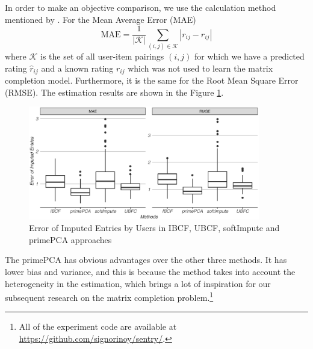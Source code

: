 \documentclass[a4paper,12pt,authoryear]{elegantpaper}
\begin{document}
    In order to make an objective comparison, we use the calculation method mentioned by \citet{hahsler_recommenderlab_2020}. For the Mean Average Error (MAE)
    \begin{equation*}
        \mathrm{MAE}=\frac{1}{|\mathcal{K}|} \sum_{(i, j) \in \mathcal{K}}\left|r_{i j}-\hat{r}_{i j}\right|
    \end{equation*}
    where $\mathcal{K}$ is the set of all user-item pairings $(i, j)$ for which we have a predicted rating $\hat{r}_{i j}$ and a known rating $r_{i j}$ which was not used to learn the matrix completion model. Furthermore, it is the same for the Root Mean Square Error (RMSE). The estimation results are shown in the Figure \ref{figure:ml10m}.

    \begin{figure}[!hbt]
        \centering
        \includegraphics[width=0.9\textwidth]{./figures/ml10m.eps}
        \caption{Error of Imputed Entries by Users in IBCF, UBCF, softImpute and primePCA approaches}
        \label{figure:ml10m}
    \end{figure}

    The primePCA has obvious advantages over the other three methods. It has lower bias and variance, and this is because the method takes into account the heterogeneity in the estimation, which brings a lot of inspiration for our subsequent research on the matrix completion problem.\footnote{All of the experiment code are available at \href{https://github.com/signorinoy/sentry/}{https://github.com/signorinoy/sentry/}.}
    
    \clearpage
    
\end{document}
